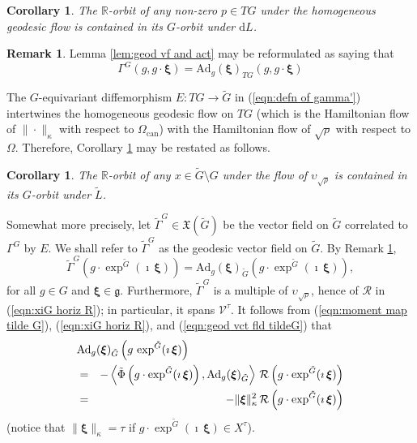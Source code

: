\documentclass[12pt,a4paper]{article}
\theoremstyle{plain}
\newtheorem{cor}[thm]{Corollary}%
\theoremstyle{definition}
\newtheorem{rem}[thm]{Remark}%
\begin{document}
\begin{cor}
The $\mathbb{R}$-orbit of any non-zero $p\in TG$ under the homogeneous geodesic flow
is contained in its $G$-orbit under $\mathrm{d}L$.
\label{cor:geodesic flow TG}
\end{cor}


\begin{rem}
\label{rem:equiv form geod}
Lemma \ref{lem:geod vf and act} may be reformulated as saying that
$$
\Gamma^G(g,g\cdot \boldsymbol{\xi})=
\mathrm{Ad}_g(\boldsymbol{\xi})_{TG}(g,g\cdot \boldsymbol{\xi})
$$
\end{rem}


The $G$-equivariant diffemorphism $E:TG\rightarrow \tilde{G}$ in
(\ref{eqn:defn of gamma'}) intertwines the homogeneous geodesic
flow on $TG$ (which is the Hamiltonian flow of $\|\cdot \|_\kappa$
with respect to $\Omega_{\mathrm{can}}$) with the Hamiltonian
flow of $\sqrt{\rho}$ with respect to $\Omega$. 
%
Therefore, 
Corollary \ref{cor:geodesic flow TG} may be restated as follows.  

\begin{cor}
The $\mathbb{R}$-orbit of any $x\in \tilde{G}\setminus G$ under the 
flow of $\upsilon_{\sqrt{\rho}}$
is contained in its $G$-orbit under $\tilde{L}$.
\label{cor:geodesic flow TG 1}
\end{cor}

Somewhat more precisely, let $\tilde{\Gamma}^G\in \mathfrak{X}(\tilde{G})$ be the vector field
on $\tilde{G}$ correlated to $\Gamma^G$ by $E$. We shall refer to $\tilde{\Gamma}^G$ as the
geodesic vector field on $\tilde{G}$.
By Remark \ref{rem:equiv form geod},
\begin{equation}
\label{eqn:geod vct fld tildeG}
\tilde{\Gamma}^G\left(g\cdot\exp^{\tilde{G}}(\imath\,\boldsymbol{\xi})  \right)
=\mathrm{Ad}_g(\boldsymbol{\xi})_{\tilde{G}}
\left(g\cdot\exp^{\tilde{G}}(\imath\,\boldsymbol{\xi})  \right),
\end{equation}
for all $g\in G$ and $\boldsymbol{\xi}\in \mathfrak{g}$.
Furthermore, $\tilde{\Gamma}^G$ is a multiple of $\upsilon_{\sqrt{\rho}}$, hence of $\mathcal{R}$ in (\ref{eqn:xiG horiz R}); in particular, it spans
$\mathcal{V}^\tau$.
It follows from (\ref{eqn:moment map tilde G}),
(\ref{eqn:xiG horiz R}),
and (\ref{eqn:geod vct fld tildeG}) that 
\begin{eqnarray}
\label{eqn:Adgxi val}
\lefteqn{ \mathrm{Ad}_g(\boldsymbol{\xi})_{\tilde{G}}\left(g\,\exp^{\tilde{G}}(\imath\,\boldsymbol{\xi})  \right)  }\\
&=&-\left\langle\tilde{\Phi} \left(g\cdot\exp^{\tilde{G}}(\imath\,\boldsymbol{\xi})  \right),
\mathrm{Ad}_g(\boldsymbol{\xi})_{\tilde{G}}  \right\rangle\,
\mathcal{R}\left(g\cdot\exp^{\tilde{G}}(\imath\,\boldsymbol{\xi})  \right)
\nonumber\\
&=&-\|\boldsymbol{\xi}\|^2_\kappa\,\mathcal{R}\left(g\cdot\exp^{\tilde{G}}(\imath\,\boldsymbol{\xi})  \right)\nonumber
\end{eqnarray}
(notice that $\|\boldsymbol{\xi}\|_\kappa=\tau$ if 
$g\cdot\exp^{\tilde{G}}(\imath\,\boldsymbol{\xi}) \in X^\tau$).
\end{document}
